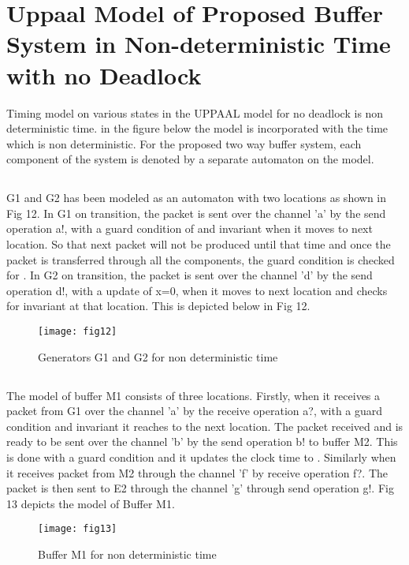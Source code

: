 \documentclass[letterpaper]{article}
\begin{document}
\section{Uppaal Model of Proposed Buffer System in Non-deterministic Time with no Deadlock}
\label{10}
Timing model on various states in the UPPAAL model for no deadlock is non deterministic time. in the figure below the model is incorporated with the time which is non deterministic. For the proposed two way buffer system, each component of the system is denoted by a separate automaton on the model.

\subsection{} G1 and G2 has been modeled as an automaton with two locations as shown in Fig 12. In G1 on transition, the packet is sent over the channel 'a' by the send operation a!, with a guard condition of  and invariant  when it moves to next location. So that next packet will not be produced until that time and once the packet is transferred through all the components, the guard condition is checked for . In G2 on transition, the packet is sent over the channel 'd' by the send operation d!, with a update of x=0, when it moves to next location and checks for invariant  at that location.  This is depicted below in Fig 12.

\begin{figure}[bpht!]
\centering
	\texttt{[image: fig12]}
		\caption{Generators G1 and G2  for non deterministic time}
	\label{Fig12}
\end{figure}

\subsection{} The model of buffer M1 consists of three locations. Firstly, when it receives a packet 	from G1 over the channel 'a' by the receive operation a?, with a guard condition  and invariant  it reaches to the next location. The packet received and is ready to be sent over the channel 'b' by the send operation b! to buffer M2. This is done with a guard condition  and it updates the clock time to . Similarly when it receives packet from M2 through the channel 'f' by receive operation f?. The packet is then sent to E2 through the channel 'g' through send operation g!. Fig 13 depicts the model of Buffer M1.

\begin{figure}[bpht!]
\centering
	\texttt{[image: fig13]}
		\caption{Buffer M1 for non deterministic time}
	\label{Fig13}
\end{figure}
	
\end{document}
